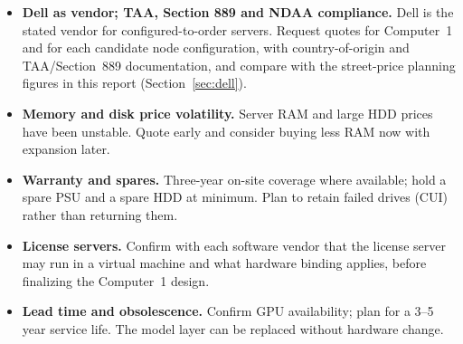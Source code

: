 \begin{itemize}
  \item \textbf{Dell as vendor; TAA, Section 889 and NDAA compliance.} Dell is the stated
    vendor for configured-to-order servers. Request quotes for Computer~1 and for each
    candidate node configuration, with country-of-origin and TAA/Section~889
    documentation, and compare with the street-price planning figures in this report
    (Section~\ref{sec:dell}).
  \item \textbf{Memory and disk price volatility.} Server RAM and large HDD prices
    have been unstable. Quote early and consider buying less RAM now with expansion
    later.
  \item \textbf{Warranty and spares.} Three-year on-site coverage where available; hold
    a spare PSU and a spare HDD at minimum. Plan to retain failed drives (CUI)
    rather than returning them.
  \item \textbf{License servers.} Confirm with each software vendor that the license
    server may run in a virtual machine and what hardware binding applies, before
    finalizing the Computer~1 design.
  \item \textbf{Lead time and obsolescence.} Confirm GPU availability; plan for a
    3--5 year service life. The model layer can be replaced without hardware change.
\end{itemize}
